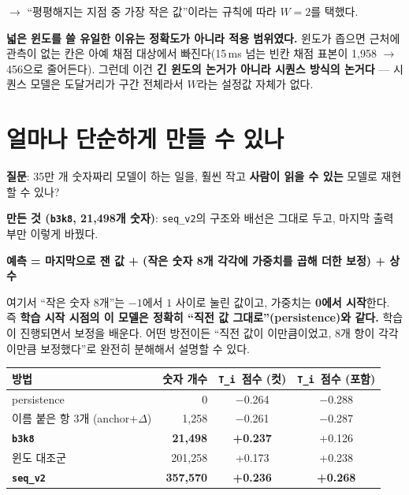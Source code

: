 \documentclass[10pt]{article}
\newcommand{\Ti}{\texttt{T\_i}}
\newcommand{\seqv}{\texttt{seq\_v2}}
\newcommand{\bthree}{\texttt{b3k8}}
\newenvironment{note}{\begin{snugshade}\small}{\end{snugshade}}
\begin{document}
$\rightarrow$ ``평평해지는 지점 중 가장 작은 값''이라는 규칙에 따라 \textbf{$W = 2$}를 택했다.

\textbf{넓은 윈도를 쓸 유일한 이유는 정확도가 아니라 적용 범위였다.} 윈도가 좁으면 근처에
관측이 없는 칸은 아예 채점 대상에서 빠진다(15\,ms 넘는 빈칸 채점 표본이 1{,}958
$\rightarrow$ 456으로 줄어든다). 그런데 이건 \textbf{긴 윈도의 논거가 아니라 시퀀스 방식의
논거다} --- 시퀀스 모델은 도달거리가 구간 전체라서 $W$라는 설정값 자체가 없다.

\section{얼마나 단순하게 만들 수 있나}

\textbf{질문}: 35만 개 숫자짜리 모델이 하는 일을, 훨씬 작고 \textbf{사람이 읽을 수 있는}
모델로 재현할 수 있나?

\textbf{만든 것 (\bthree, 21{,}498개 숫자)}: \seqv 의 구조와 배선은 그대로 두고, 마지막
출력부만 이렇게 바꿨다.

\begin{note}
\textbf{예측 = 마지막으로 잰 값 + (작은 숫자 8개 각각에 가중치를 곱해 더한 보정) + 상수}
\end{note}

여기서 ``작은 숫자 8개''는 $-1$에서 $1$ 사이로 눌린 값이고, 가중치는 \textbf{0에서
시작}한다. 즉 \textbf{학습 시작 시점의 이 모델은 정확히 ``직전 값 그대로''(persistence)와
같다.} 학습이 진행되면서 보정을 배운다. 어떤 방전이든 ``직전 값이 이만큼이었고, 8개 항이
각각 이만큼 보정했다''로 완전히 분해해서 설명할 수 있다.

\begin{center}
\begin{tabular}{@{}lrcc@{}}
\toprule
\textbf{방법} & \textbf{숫자 개수} & \textbf{\Ti\ 점수 (컷)} & \textbf{\Ti\ 점수 (포함)} \\
\midrule
persistence & 0 & $-$0.264 & $-$0.288 \\
이름 붙은 항 3개 (anchor+$\Delta$) & 1{,}258 & $-$0.261 & $-$0.287 \\
\textbf{\bthree} & \textbf{21{,}498} & \textbf{+0.237} & +0.126 \\
윈도 대조군 & 201{,}258 & +0.173 & +0.238 \\
\textbf{\seqv} & \textbf{357{,}570} & \textbf{+0.236} & \textbf{+0.268} \\
\bottomrule
\end{tabular}
\end{center}
\end{document}
